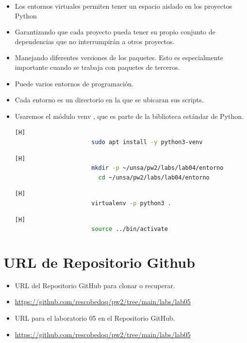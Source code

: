 \documentclass{article}
\begin{document}
\begin{itemize}
\begin{itemize}
            \begin{itemize}
                \item Los entornos virtuales permiten tener un espacio aislado en los proyectos Python
                \item Garantizando que cada proyecto pueda tener su propio conjunto de dependencias que no interrumpirán a otros proyectos.
                \item Manejando diferentes versiones de los paquetes. Esto es especialmente importante cuando se trabaja con paquetes de terceros.
                \item Puede varios entornos de programación.
                \item Cada entorno es un directorio en la que se ubicaran sus scripts.
                \item Usaremos el módulo venv , que es parte de la biblioteca estándar de Python.
                \begin{lstlisting}[language=bash,caption={Entorno de Linux-Instalemos venv escribiendo:}][H]
    		          sudo apt install -y python3-venv
    	        \end{lstlisting}
                \begin{lstlisting}[language=bash,caption={Entorno de Linux-Para crear un ambiente elija en qué directorio.}][H]
    		          mkdir -p ~/unsa/pw2/labs/lab04/entorno
                        cd ~/unsa/pw2/labs/lab04/entorno
    	        \end{lstlisting}
                \begin{lstlisting}[language=bash,caption={Entorno de Linux-En el directorio crea un entorno virtual ejecutando el siguiente comando:}][H]
    		          virtualenv -p python3 .
    	        \end{lstlisting}
                \begin{lstlisting}[language=bash,caption={Entorno de Linux-Ejecute el script de activación para activar el entorno virtual:}][H]
    		          source ../bin/activate
    	        \end{lstlisting}
            \end{itemize}
        \end{itemize}
	\end{itemize}
	
	\section{URL de Repositorio Github}
	\begin{itemize}
		\item URL del Repositorio GitHub para clonar o recuperar.
		\item \url{https://github.com/rescobedoq/pw2/tree/main/labs/lab05}
		\item URL para el laboratorio 05 en el Repositorio GitHub.
		\item \url{https://github.com/rescobedoq/pw2/tree/main/labs/lab05}
	\end{itemize}
	
\end{document}
